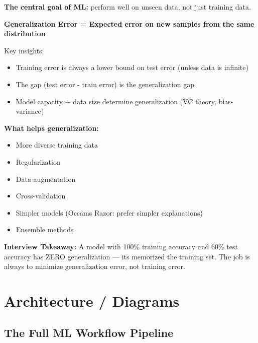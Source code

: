 \documentclass[11pt]{article}
\providecommand{\tightlist}{\setlength{\itemsep}{1pt}\setlength{\parskip}{0pt}}
\begin{document}
\textbf{The central goal of ML:} perform well on unseen data, not just training data.

\textbf{Generalization Error = Expected error on new samples from the same distribution}

Key insights:

\begin{itemize}
\tightlist
\item
  Training error is always a lower bound on test error (unless data is infinite)
\item
  The gap (test error - train error) is the generalization gap
\item
  Model capacity + data size determine generalization (VC theory, bias-variance)
\end{itemize}

\textbf{What helps generalization:}

\begin{itemize}
\tightlist
\item
  More diverse training data
\item
  Regularization
\item
  Data augmentation
\item
  Cross-validation
\item
  Simpler models (Occam\textquotesingle s Razor: prefer simpler explanations)
\item
  Ensemble methods
\end{itemize}

\textbf{Interview Takeaway:} A model with 100\% training accuracy and 60\% test accuracy has ZERO generalization --- it\textquotesingle s memorized the training set. The job is always to minimize generalization error, not training error.

\section{Architecture / Diagrams}\label{architecture--diagrams}

\subsection{The Full ML Workflow Pipeline}\label{the-full-ml-workflow-pipeline}

\setcodelang{}
\end{document}
